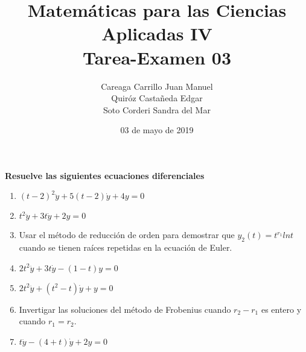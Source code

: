 \documentclass{article}
\title{
    Matemáticas para las Ciencias Aplicadas IV\\
    Tarea-Examen 03 
}
\author{
    Careaga Carrillo Juan Manuel \\
    Quiróz Castañeda Edgar \\
    Soto Corderi Sandra del Mar
}
\date{
    03 de mayo de 2019
}
\begin{document}
    \maketitle
    {\bf Resuelve las siguientes ecuaciones diferenciales}
    \begin{enumerate}
        
        \item {
            $(t - 2)^2 \ddot y + 5(t-2)\dot y+4y=0$\\

            \color{azul}
            
        }
        \item {
            $t^2 \ddot y+ 3t \dot y + 2y =0$\\

            \color{azul}
            
        }
        \item {
            Usar el método de reducción de orden para demostrar que 
            $y_2(t) = t ^ {r_1} ln t$ cuando se tienen raíces repetidas en la 
            ecuación de Euler. 

            \color{azul}
           
        }
        \item {
            $2t^2\ddot y + 3t\dot y - (1 - t)y = 0$

            \color{azul}

        }

        \item {
            $2t^2\ddot y + (t^2 - t)\dot y + y = 0$

            \color{azul}

        }

        \item {
            Invertigar las soluciones del método de Frobenius cuando $r_2 - r_1$
            es entero y cuando $r_1 = r_2$.

            \color{azul}
        }

        \item {
            $t\ddot y - (4 + t)\dot y + 2y = 0$

            \color{azul}
        }


\end{enumerate}
\end{document}
